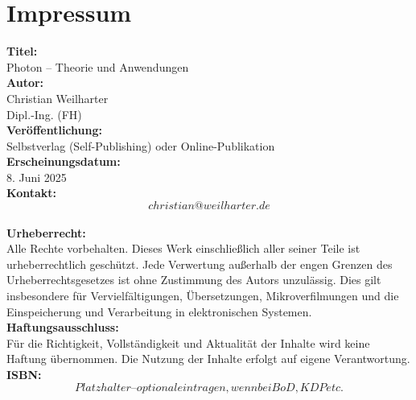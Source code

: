 \chapter*{Impressum}
\label{chap:imp}
\begin{flushleft}
	
	\textbf{Titel:} \\
	Photon – Theorie und Anwendungen \\[1em]
	
	\textbf{Autor:} \\
	Christian Weilharter \\
	Dipl.-Ing. (FH) \\[1em]
	
	\textbf{Veröffentlichung:} \\
	Selbstverlag (Self-Publishing) oder Online-Publikation \\[1em]
	
	\textbf{Erscheinungsdatum:} \\
	8. Juni 2025 \\[1em]
	
	\textbf{Kontakt:} \\
	\[christian@weilharter.de\] \\[1em]
	
	\textbf{Urheberrecht:} \\
	Alle Rechte vorbehalten. Dieses Werk einschließlich aller seiner Teile ist urheberrechtlich geschützt. Jede Verwertung außerhalb der engen Grenzen des Urheberrechtsgesetzes ist ohne Zustimmung des Autors unzulässig. Dies gilt insbesondere für Vervielfältigungen, Übersetzungen, Mikroverfilmungen und die Einspeicherung und Verarbeitung in elektronischen Systemen. \\[1em]
	
	\textbf{Haftungsausschluss:} \\
	Für die Richtigkeit, Vollständigkeit und Aktualität der Inhalte wird keine Haftung übernommen. Die Nutzung der Inhalte erfolgt auf eigene Verantwortung. \\[1em]
	
	\textbf{ISBN:} \\
	\[Platzhalter – optional eintragen, wenn bei BoD, KDP etc.\]
	
\end{flushleft}

